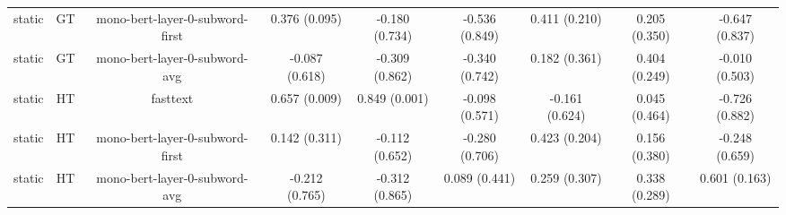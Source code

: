 \begin{sidewaystable}[htb]
\begin{tabular}{@{}ccccccccc@{}}
        static & GT & mono-bert-layer-0-subword-first & 0.376 (0.095) & -0.180 (0.734) & -0.536 (0.849) & 0.411 (0.210) & 0.205 (0.350) & -0.647 (0.837) \\
        static & GT & mono-bert-layer-0-subword-avg & -0.087 (0.618) & -0.309 (0.862) & -0.340 (0.742) & 0.182 (0.361) & 0.404 (0.249) & -0.010 (0.503) \\
        static & HT & fasttext & 0.657 (0.009) & 0.849 (0.001) & -0.098 (0.571) & -0.161 (0.624) & 0.045 (0.464) & -0.726 (0.882) \\
        static & HT & mono-bert-layer-0-subword-first & 0.142 (0.311) & -0.112 (0.652) & -0.280 (0.706) & 0.423 (0.204) & 0.156 (0.380) & -0.248 (0.659) \\
        static & HT & mono-bert-layer-0-subword-avg & -0.212 (0.765) & -0.312 (0.865) & 0.089 (0.441) & 0.259 (0.307) & 0.338 (0.289) & 0.601 (0.163) \\
        \bottomrule
    \end{tabular}
\end{sidewaystable}